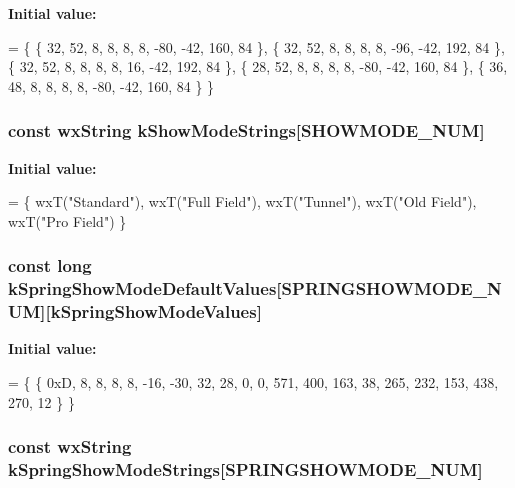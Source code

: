 {\bfseries Initial value\-:}
\begin{DoxyCode}
=
\{
    \{ 32, 52, 8, 8, 8, 8, -80, -42, 160, 84 \},
    \{ 32, 52, 8, 8, 8, 8, -96, -42, 192, 84 \},
    \{ 32, 52, 8, 8, 8, 8, 16, -42, 192, 84 \},
    \{ 28, 52, 8, 8, 8, 8, -80, -42, 160, 84 \},
    \{ 36, 48, 8, 8, 8, 8, -80, -42, 160, 84 \}
\}
\end{DoxyCode}
\hypertarget{a00190_a022c27d9633256775696f727390f8d65}{
\subsubsection[{k\-Show\-Mode\-Strings}]{\setlength{\rightskip}{0pt plus 5cm}const wx\-String k\-Show\-Mode\-Strings\mbox{[}{\bf S\-H\-O\-W\-M\-O\-D\-E\-\_\-\-N\-U\-M}\mbox{]}}}\label{a00190_a022c27d9633256775696f727390f8d65}
{\bfseries Initial value\-:}
\begin{DoxyCode}
=
\{
    wxT(\textcolor{stringliteral}{"Standard"}),
    wxT(\textcolor{stringliteral}{"Full Field"}),
    wxT(\textcolor{stringliteral}{"Tunnel"}),
    wxT(\textcolor{stringliteral}{"Old Field"}),
    wxT(\textcolor{stringliteral}{"Pro Field"})
\}
\end{DoxyCode}
\hypertarget{a00190_a6a349e720aeaf7f48f61d5512bd37daf}{
\subsubsection[{k\-Spring\-Show\-Mode\-Default\-Values}]{\setlength{\rightskip}{0pt plus 5cm}const long k\-Spring\-Show\-Mode\-Default\-Values\mbox{[}{\bf S\-P\-R\-I\-N\-G\-S\-H\-O\-W\-M\-O\-D\-E\-\_\-\-N\-U\-M}\mbox{]}\mbox{[}{\bf k\-Spring\-Show\-Mode\-Values}\mbox{]}}}\label{a00190_a6a349e720aeaf7f48f61d5512bd37daf}
{\bfseries Initial value\-:}
\begin{DoxyCode}
=
\{
    \{ 0xD, 8, 8, 8, 8, -16, -30, 32, 28, 0, 0, 571, 400, 163, 38, 265, 232, 153, 438, 270, 12 \}
\}
\end{DoxyCode}
\hypertarget{a00190_af0f69d4778ec6c5a8eb06eef348200d8}{
\subsubsection[{k\-Spring\-Show\-Mode\-Strings}]{\setlength{\rightskip}{0pt plus 5cm}const wx\-String k\-Spring\-Show\-Mode\-Strings\mbox{[}{\bf S\-P\-R\-I\-N\-G\-S\-H\-O\-W\-M\-O\-D\-E\-\_\-\-N\-U\-M}\mbox{]}}}\label{a00190_af0f69d4778ec6c5a8eb06eef348200d8}
